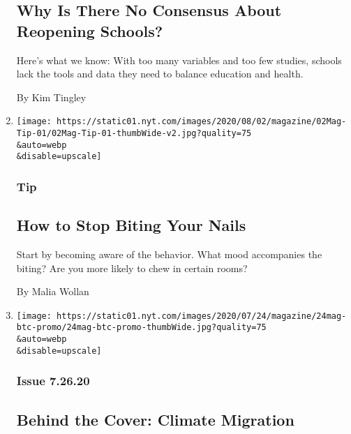 \begin{enumerate}
  \hypertarget{why-is-there-no-consensus-about-reopening-schools}{%
  \subsection{Why Is There No Consensus About Reopening
  Schools?}\label{why-is-there-no-consensus-about-reopening-schools}}

  Here's what we know: With too many variables and too few studies,
  schools lack the tools and data they need to balance education and
  health.

  By Kim Tingley
\item
  \href{/2020/07/28/magazine/how-to-stop-biting-your-nails.html}{}

  \texttt{[image: https://static01.nyt.com/images/2020/08/02/magazine/02Mag-Tip-01/02Mag-Tip-01-thumbWide-v2.jpg?quality=75\\\&auto=webp\\\&disable=upscale]}

  \hypertarget{tip-}{%
  \subsubsection{Tip }\label{tip-}}

  \hypertarget{how-to-stop-biting-your-nails}{%
  \subsection{How to Stop Biting Your
  Nails}\label{how-to-stop-biting-your-nails}}

  Start by becoming aware of the behavior. What mood accompanies the
  biting? Are you more likely to chew in certain rooms?

  By Malia Wollan
\item
  \href{/2020/07/24/magazine/behind-the-cover-climate-migration.html}{}

  \texttt{[image: https://static01.nyt.com/images/2020/07/24/magazine/24mag-btc-promo/24mag-btc-promo-thumbWide.jpg?quality=75\\\&auto=webp\\\&disable=upscale]}

  \hypertarget{issue-72620}{%
  \subsubsection{Issue 7.26.20}\label{issue-72620}}

  \hypertarget{behind-the-cover-climate-migration}{%
  \subsection{Behind the Cover: Climate
  Migration}\label{behind-the-cover-climate-migration}}


\end{enumerate}
